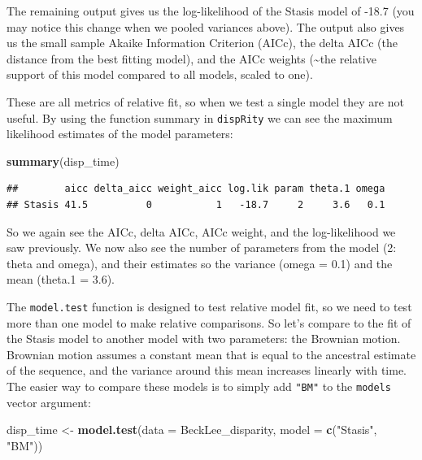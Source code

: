 \documentclass[
]{book}
\newenvironment{Shaded}{\begin{snugshade}}{\end{snugshade}}
\newcommand{\DataTypeTok}[1]{\textcolor[rgb]{0.13,0.29,0.53}{#1}}
\newcommand{\KeywordTok}[1]{\textcolor[rgb]{0.13,0.29,0.53}{\textbf{#1}}}
\newcommand{\NormalTok}[1]{#1}
\newcommand{\StringTok}[1]{\textcolor[rgb]{0.31,0.60,0.02}{#1}}
\begin{document}
The remaining output gives us the log-likelihood of the Stasis model of -18.7 (you may notice this change when we pooled variances above).
The output also gives us the small sample Akaike Information Criterion (AICc), the delta AICc (the distance from the best fitting model), and the AICc weights (\textasciitilde the relative support of this model compared to all models, scaled to one).

These are all metrics of relative fit, so when we test a single model they are not useful.
By using the function summary in \texttt{dispRity} we can see the maximum likelihood estimates of the model parameters:

\begin{Shaded}
\begin{Highlighting}[]
\KeywordTok{summary}\NormalTok{(disp\_time)}
\end{Highlighting}
\end{Shaded}

\begin{verbatim}
##        aicc delta_aicc weight_aicc log.lik param theta.1 omega
## Stasis 41.5          0           1   -18.7     2     3.6   0.1
\end{verbatim}

So we again see the AICc, delta AICc, AICc weight, and the log-likelihood we saw previously.
We now also see the number of parameters from the model (2: theta and omega), and their estimates so the variance (omega = 0.1) and the mean (theta.1 = 3.6).

The \texttt{model.test} function is designed to test relative model fit, so we need to test more than one model to make relative comparisons.
So let's compare to the fit of the Stasis model to another model with two parameters: the Brownian motion.
Brownian motion assumes a constant mean that is equal to the ancestral estimate of the sequence, and the variance around this mean increases linearly with time.
The easier way to compare these models is to simply add \texttt{"BM"} to the \texttt{models} vector argument:

\begin{Shaded}
\begin{Highlighting}[]
\NormalTok{disp\_time \textless{}{-}}\StringTok{ }\KeywordTok{model.test}\NormalTok{(}\DataTypeTok{data =}\NormalTok{ BeckLee\_disparity,}
                        \DataTypeTok{model =} \KeywordTok{c}\NormalTok{(}\StringTok{"Stasis"}\NormalTok{, }\StringTok{"BM"}\NormalTok{))}
\end{Highlighting}
\end{Shaded}
\end{document}
